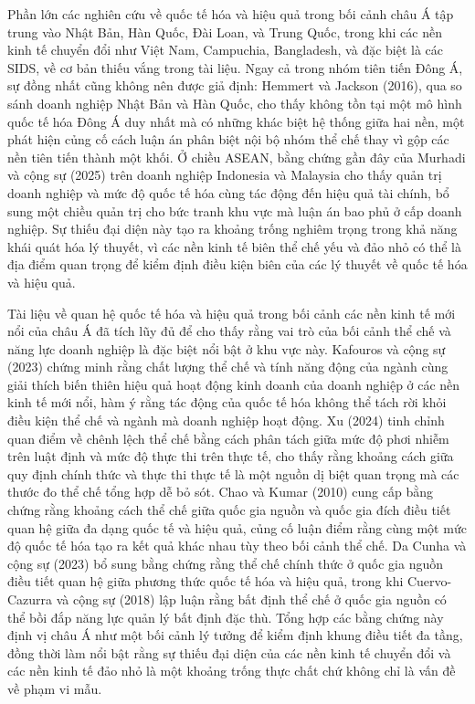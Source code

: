 \documentclass[
  a4paper,
  13pt]{extreport}
\begin{document}
Phần lớn các nghiên cứu về quốc tế hóa và hiệu quả trong bối cảnh châu Á
tập trung vào Nhật Bản, Hàn Quốc, Đài Loan, và Trung Quốc, trong khi các
nền kinh tế chuyển đổi như Việt Nam, Campuchia, Bangladesh, và đặc biệt
là các SIDS, về cơ bản thiếu vắng trong tài liệu. Ngay cả trong nhóm
tiên tiến Đông Á, sự đồng nhất cũng không nên được giả định: Hemmert và
Jackson (2016), qua so sánh doanh nghiệp Nhật Bản và Hàn Quốc, cho thấy
không tồn tại một mô hình quốc tế hóa Đông Á duy nhất mà có những khác
biệt hệ thống giữa hai nền, một phát hiện củng cố cách luận án phân biệt
nội bộ nhóm thể chế thay vì gộp các nền tiên tiến thành một khối. Ở
chiều ASEAN, bằng chứng gần đây của Murhadi và cộng sự (2025) trên doanh
nghiệp Indonesia và Malaysia cho thấy quản trị doanh nghiệp và mức độ
quốc tế hóa cùng tác động đến hiệu quả tài chính, bổ sung một chiều quản
trị cho bức tranh khu vực mà luận án bao phủ ở cấp doanh nghiệp. Sự
thiếu đại diện này tạo ra khoảng trống nghiêm trọng trong khả năng khái
quát hóa lý thuyết, vì các nền kinh tế biên thể chế yếu và đảo nhỏ có
thể là địa điểm quan trọng để kiểm định điều kiện biên của các lý thuyết
về quốc tế hóa và hiệu quả.

Tài liệu về quan hệ quốc tế hóa và hiệu quả trong bối cảnh các nền kinh
tế mới nổi của châu Á đã tích lũy đủ để cho thấy rằng vai trò của bối
cảnh thể chế và năng lực doanh nghiệp là đặc biệt nổi bật ở khu vực này.
Kafouros và cộng sự (2023) chứng minh rằng chất lượng thể chế và tính
năng động của ngành cùng giải thích biến thiên hiệu quả hoạt động kinh
doanh của doanh nghiệp ở các nền kinh tế mới nổi, hàm ý rằng tác động
của quốc tế hóa không thể tách rời khỏi điều kiện thể chế và ngành mà
doanh nghiệp hoạt động. Xu (2024) tinh chỉnh quan điểm về chênh lệch thể
chế bằng cách phân tách giữa mức độ phơi nhiễm trên luật định và mức độ
thực thi trên thực tế, cho thấy rằng khoảng cách giữa quy định chính
thức và thực thi thực tế là một nguồn dị biệt quan trọng mà các thước đo
thể chế tổng hợp dễ bỏ sót. Chao và Kumar (2010) cung cấp bằng chứng
rằng khoảng cách thể chế giữa quốc gia nguồn và quốc gia đích điều tiết
quan hệ giữa đa dạng quốc tế và hiệu quả, củng cố luận điểm rằng cùng
một mức độ quốc tế hóa tạo ra kết quả khác nhau tùy theo bối cảnh thể
chế. Da Cunha và cộng sự (2023) bổ sung bằng chứng rằng thể chế chính
thức ở quốc gia nguồn điều tiết quan hệ giữa phương thức quốc tế hóa và
hiệu quả, trong khi Cuervo-Cazurra và cộng sự (2018) lập luận rằng bất
định thể chế ở quốc gia nguồn có thể bồi đắp năng lực quản lý bất định
đặc thù. Tổng hợp các bằng chứng này định vị châu Á như một bối cảnh lý
tưởng để kiểm định khung điều tiết đa tầng, đồng thời làm nổi bật rằng
sự thiếu đại diện của các nền kinh tế chuyển đổi và các nền kinh tế đảo
nhỏ là một khoảng trống thực chất chứ không chỉ là vấn đề về phạm vi
mẫu.
\end{document}
